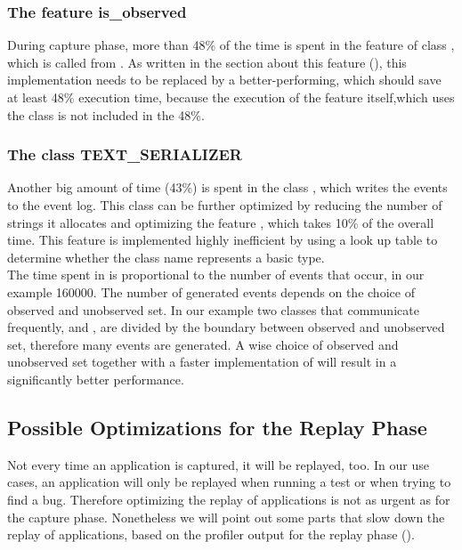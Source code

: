 \subsubsection{The feature is\_observed}
During capture phase, more than 48\% of the time is spent in the feature  of class , which is called from . As written in the section about this feature (), this implementation needs to be replaced by a better-performing, which should save at least 48\% execution time, because the execution of the feature  itself,which uses the class   is not included in the 48\%.

\subsubsection{The class TEXT\_SERIALIZER}
Another big amount of time (43\%) is spent in the class , which writes the events to the event log. This class can be further optimized by reducing the number of strings it allocates and optimizing the feature , which takes 10\% of the overall time. This feature is implemented highly inefficient by using a look up table to determine whether the class name represents a basic type.\\
The time spent in  is proportional to the number of events that occur, in our example 160000. The number of generated events depends on the choice of observed and unobserved set. In our example two classes that communicate frequently,  and , are divided by the boundary between observed and unobserved set, therefore many events are generated. A wise choice of observed and unobserved set together with a faster implementation of  will result in a significantly better performance.


\subsection {Possible Optimizations for the Replay Phase}
Not every time an application is captured, it will be replayed, too. In our use cases, an application will only be replayed when running a test or when trying to find a bug. Therefore optimizing the replay of applications is not as urgent as for the capture phase. Nonetheless we will point out some parts that slow down the replay of applications, based on the profiler output for the replay phase ().


